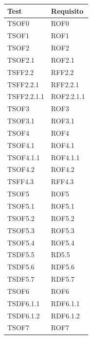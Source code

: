 \documentclass[openany,12pt,a4paper]{report}
\begin{document}
\begin{longtable}{| p{4cm} |p{4cm}  |}
	\hline
	\textbf{Test} & \textbf{Requisito}\\
	\hline
	\endhead
	TSOF0&ROF0
	\\[1em]
	\hline TSOF1&ROF1
	\\[1em]	
	\hline
	 TSOF2&ROF2
	\\[1em]	
	\hline	
	 TSOF2.1&ROF2.1
	\\[1em]	
	\hline	
	 TSFF2.2&RFF2.2
	\\[1em]	
	\hline
	 TSFF2.2.1&RFF2.2.1
	\\[1em]	
	\hline
	 TSFF2.2.1.1&ROF2.2.1.1
	\\[1em]	
	\hline
	 TSOF3&ROF3
	\\[1em]	
	\hline	
	 TSOF3.1&ROF3.1
	\\[1em]		
	\hline
	 TSOF4&ROF4
	\\[1em]
	\hline
	 TSOF4.1&ROF4.1
	\\[1em]
	
	\hline	
	TSOF4.1.1&ROF4.1.1
	\\[1em]
	
	\hline
	 TSOF4.2&ROF4.2
	\\[1em]
	\hline
	 TSFF4.3&RFF4.3
	\\[1em]
	\hline
	 TSOF5&ROF5
	\\[1em]
	\hline
	 TSOF5.1&ROF5.1
	\\[1em]	
	\hline
	 TSOF5.2&ROF5.2
	\\[1em]	
	\hline
	 TSOF5.3&ROF5.3
	\\[1em]	
	\hline
	 TSOF5.4&ROF5.4
	\\[1em]	
	\hline
	TSDF5.5&RD5.5
	\\[1em]
	\hline
	 TSDF5.6&RDF5.6
	\\[1em]
	\hline
	 TSDF5.7&RDF5.7
	\\[1em]
	\hline
	 TSOF6&ROF6
	\\[1em]
	\hline
	 TSDF6.1.1&RDF6.1.1
	\\[1em]
	\hline	
	 TSDF6.1.2&RDF6.1.2
	\\[1em]
	\hline	
	 TSOF7&ROF7
	\\[1em]
	

\end{longtable}
\end{document}
